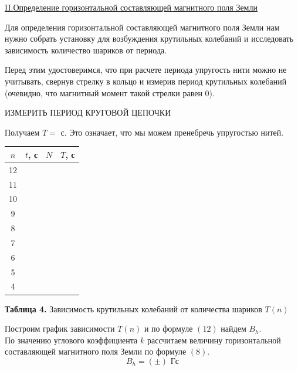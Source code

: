 \documentclass{article}
\begin{document}
\begin{center}
    \underline{\large {\RN{2}.Определение горизонтальной составляющей магнитного поля Земли}}
\end{center}

Для определения горизонтальной составляющей магнитного поля Земли нам нужно собрать установку для возбуждения крутильных колебаний и исследовать зависимость количество шариков от периода. 

Перед этим удостоверимся, что при расчете периода упругость нити можно не учитывать, свернув стрелку в кольцо и измерив период крутильных колебаний (очевидно, что магнитный момент такой стрелки равен 0).

\begin{center}
    \LARGE {ИЗМЕРИТЬ ПЕРИОД КРУГОВОЙ ЦЕПОЧКИ}    
\end{center}

Получаем $T = $ с. Это означает, что мы можем пренебречь упругостью нитей.

\begin{center}
    \begin{tabular}{|c|c|c|c|}
        \hline
        $n$ & $t$, с & $N$ & $T$, с \\
        \hline
        12 &  &  &  \\
        \hline
        11 & & & \\
        \hline
        10 & & & \\
        \hline
        9 & & & \\
        \hline
        8 & & & \\
        \hline
        7 & & & \\
        \hline
        6 & & & \\
        \hline
        5 & & & \\
        \hline
        4 & & & \\ 
        \hline
    \end{tabular}
    
    \textbf{Таблица 4. } Зависимость крутильных колебаний от количества шариков $T(n)$
\end{center}

Построим график зависимости $T(n)$ и по формуле $(12)$ найдем $B_h$.\\



По значению углового коэффициента $k$ рассчитаем величину горизонтальной составляющей магнитного поля Земли по формуле $(8)$.
\[
    B_h = ( \pm ) \text{ Гс}
\]
\end{document}
